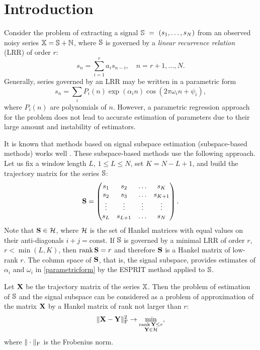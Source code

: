 \documentclass[sii]{ipart}
\def\rank{\mathop{\mathrm{rank}}}
\begin{document}
\section{Introduction}
Consider the problem of extracting a signal $\mathbb{S}~=~(s_1, \ldots, s_N)$ from an observed noisy series $\mathbb{X} = \mathbb{S} + \mathbb{N}$, where $\mathbb{S}$ is governed by a \emph{linear recurrence relation} (LRR) of order $r$:
\begin{equation*}
s_n = \sum_{i = 1}^{r} a_i s_{n-i}, \quad n = r + 1, \ldots, N.
\end{equation*}
Generally, series governed by an LRR may be written in a parametric form
\begin{equation} \label{parametricform}
s_n = \sum_i P_i(n) \exp(\alpha_i n) \cos(2 \pi \omega_i n + \psi_i),
\end{equation}
where $P_i(n)$ are polynomials of $n$. However, a parametric regression approach for the problem does not lead to accurate estimation of parameters due to their large amount and instability of estimators.

It is known that methods based on signal subspace estimation (subspace-based methods) works well \cite{Broomhead.King1986, Vautard.etal1992, Elsner.Tsonis1996, Golyandina.etal2001}. These subspace-based methods use the following approach. Let us fix a window length $L$, $1 \le L \le N$, set $K = N - L + 1$, and build the trajectory matrix for the series $\mathbb{S}$:
\begin{equation*}
\bfS = \begin{pmatrix}
s_1 & s_2 & \ldots & s_K \\
s_2 & s_3 & \ldots & s_{K + 1} \\
\vdots & \vdots & \vdots & \vdots \\
s_L & s_{L + 1} & \ldots & s_N
\end{pmatrix}.
\end{equation*}
Note that $\mathbf{S}\in \mathcal{H}$, where $\mathcal{H}$ is the set of Hankel matrices with equal values on their anti-diagonals $i+j=\mathrm{const}$.
If $\mathbb{S}$ is governed by a minimal LRR of order $r$, $r < \min(L, K)$, then $\rank \bfS = r$ and therefore $\mathbf{S}$ is a Hankel matrix of low-rank $r$. The column space of $\mathbf{S}$, that is, the  signal subspace, provides estimates of $\alpha_i$ and $\omega_i$ in \eqref{parametricform} by the ESPRIT method \cite{Roy.Kailath1989, Golyandina.Zhigljavsky2012} applied to $\mathbb{S}$.

Let $\mathbf{X}$ be the trajectory matrix of the series $\mathbb{X}$. Then the problem of estimation of $\mathbb{S}$ and the signal subspace can be considered as a problem of approximation of the matrix $\mathbf{X}$ by a Hankel matrix of rank not larger than $r$:
\begin{equation}\label{introd_task}
\|\bfX - \bfY\|^2_\rmF \to \min_{\substack{\rank \bfY \le r \\ \bfY \in \calH}},
\end{equation}
where $\|\cdot\|_{\mathrm{F}}$ is the Frobenius norm.
\end{document}
